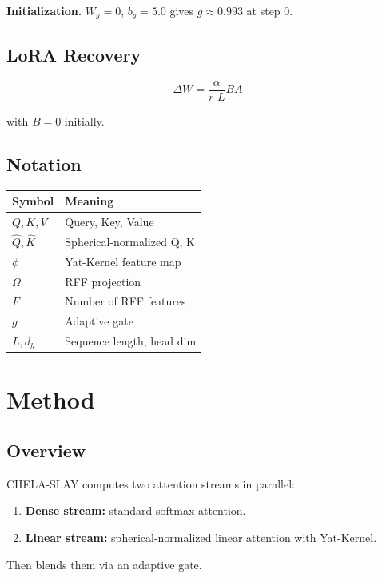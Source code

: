 \textbf{Initialization.} $W_g = 0$, $b_g = 5.0$ gives $g \approx 
0.993$ at step 0.

\subsection{LoRA Recovery}

\[
\Delta W = \frac{\alpha}{r\_L} B A
\]

with $B = 0$ initially.

\subsection{Notation}

\begin{table}[H]
\centering
\small
\begin{tabular}{ll}
\toprule
\textbf{Symbol} & \textbf{Meaning} \\
\midrule
$Q, K, V$ & Query, Key, Value \\
$\hat{Q}, \hat{K}$ & Spherical-normalized Q, K \\
$\phi$ & Yat-Kernel feature map \\
$\Omega$ & RFF projection \\
$F$ & Number of RFF features \\
$g$ & Adaptive gate \\
$L, d_h$ & Sequence length, head dim \\
\bottomrule
\end{tabular}
\end{table}



\section{Method}

\subsection{Overview}

CHELA-SLAY computes two attention streams in parallel:

\begin{enumerate}
\item \textbf{Dense stream:} standard softmax attention.
\item \textbf{Linear stream:} spherical-normalized linear attention with Yat-Kernel.

\end{enumerate}
Then blends them via an adaptive gate.

